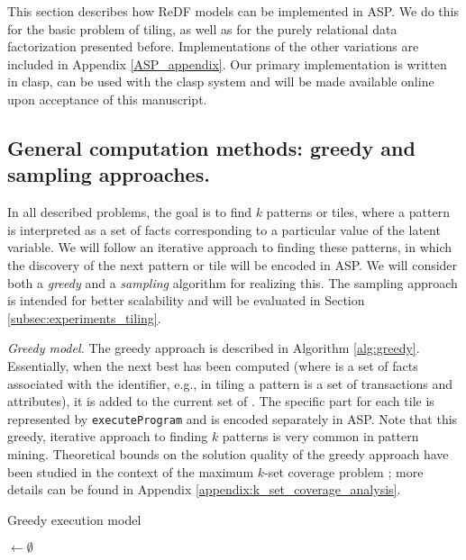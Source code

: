 This section describes how ReDF models can be implemented in ASP. We do this for the basic problem of tiling, as well as for the purely relational data factorization presented before. Implementations of the other variations are included in Appendix \ref{ASP_appendix}. Our primary implementation is written in clasp, can be used with the clasp system \parencite{aspbook,BrewkaCACM} and will be made available online upon acceptance of this manuscript.

\subsection{General computation methods: greedy and sampling approaches.} 
In all described problems, the goal is to find $k$ patterns or tiles, where a pattern is interpreted as a set of facts corresponding to a particular value of the latent variable. 
We will follow an iterative approach to finding these patterns,
in which the discovery of the next pattern or tile will be encoded in ASP.
We will consider both a {\em greedy} and a {\em sampling} algorithm
for realizing this. The sampling approach is intended for better scalability and will
be evaluated in Section \ref{subsec:experiments_tiling}.

\textit{Greedy model.}
The greedy approach is described  in  Algorithm \ref{alg:greedy}. Essentially, 
when the next best \tile has been computed (where \tile is a set of facts associated with the \tile identifier, e.g., in tiling a pattern is a set of transactions and attributes), it is added to the current set of \tiles. The specific part for each tile is represented by \texttt{executeProgram} and is encoded separately in ASP. Note that this greedy, iterative approach to finding $k$ patterns is very common in pattern mining. 
\changesb Theoretical bounds on the solution quality of the greedy approach have been studied in the context of the maximum $k$-set coverage problem \parencite{max_k_set_cover1, max_k_set_cover2}; more details can be found in Appendix \ref{appendix:k_set_coverage_analysis}. \changese
\begin{algorithm}[thb]
  \small
 \caption{Greedy execution model}
 \label{alg:greedy}
 \tiles$ \gets \emptyset$\;
  \normalsize
\end{algorithm}

